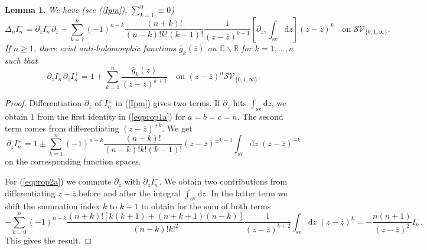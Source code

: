 \documentclass[oneside]{amsart}
\newcommand{\CC}{{\mathbb C}}
\newcommand{\RR}{{\mathbb R}}
\newcommand{\dd}{\mathrm{d}}
\newcommand{\gggg}{{\overline{g}}}
\newcommand{\zz}{{\overline{z}}}
\newcommand{\sS}{\mathcal{S}}
\newcommand{\sV}{\mathcal{V}}
\newcommand{\intsv}{\int_\mathrm{sv}}
\theoremstyle{plain}
\newtheorem{lem}[thm]{Lemma}
\begin{document}
\begin{lem}
We have (see (\ref{Ipm}), $\sum_{k=1}^0\equiv0$)
\begin{equation}\label{eqprop2a}
\Delta_nI^-_n=\partial_zI^-_n\partial_\zz-\sum_{k=1}^n(-1)^{n-k}\frac{(n+k)!}{(n-k)!k!(k-1)!}\frac{1}{(z-\zz)^{k+1}}\left[\partial_\zz,\intsv\dd z\right](z-\zz)^k
\quad\text{on }\sS\sV_{\{0,1,\infty\}}.
\end{equation}
If $n\geq1$, there exist anti-holomorphic functions $\gggg_k(\zz)$ on $\CC\backslash\RR$ for $k=1,\ldots,n$ such that
\begin{equation}\label{eqprop2b}
\partial_zI^-_n\partial_zI^+_n=1+\sum_{k=1}^n\frac{\gggg_k(\zz)}{(z-\zz)^{k+1}}\quad\text{on }(z-\zz)^n\sS\sV_{\{0,1,\infty\}}.
\end{equation}
\end{lem}
\begin{proof}
Differentiation $\partial_z$ of $I^\pm_n$ in (\ref{Ipm}) gives two terms. If $\partial_z$ hits $\intsv\dd z$, we obtain 1 from the first identity in (\ref{eqprop1a}) for $a=b=c=n$.
The second term comes from differentiating $(z-\zz)^{\pm k}$. We get
\begin{equation}\label{eqpf2prop2pf}
\partial_zI^\pm_n=1\pm\sum_{k=1}^n(-1)^{n-k}\frac{(n+k)!}{(n-k)!k!(k-1)!}(z-\zz)^{\pm k-1}\intsv\dd z\;(z-\zz)^{\mp k}
\end{equation}
on the corresponding function spaces.

For (\ref{eqprop2a}) we commute $\partial_\zz$ with $\partial_zI^-_n$.
We obtain two contributions from differentiating $z-\zz$ before and after the integral $\intsv\dd z$. In the latter term we shift the summation index $k$ to $k+1$ to obtain
for the sum of both terms
$$
-\sum_{k=0}^n(-1)^{n-k}\frac{(n+k)![k(k+1)+(n+k+1)(n-k)]}{(n-k)!k!^2}\frac{1}{(z-\zz)^{k+2}}\intsv\dd z\;(z-\zz)^k=-\frac{n(n+1)}{(z-\zz)^2}I^-_n.
$$
This gives the result.


\end{proof}
\end{document}
